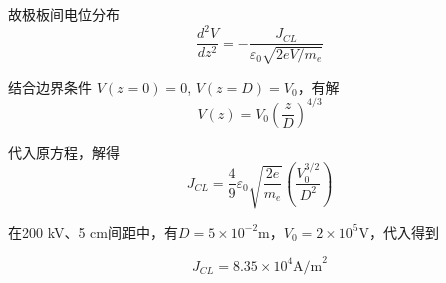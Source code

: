 \documentclass{article}
\begin{document}
故极板间电位分布 $$ \frac{d^2V}{dz^2} = -\frac{J_{CL}}{\varepsilon_0\sqrt{2eV/m_e}} $$

结合边界条件 $V(z = 0) = 0$, $V(z = D) = V_0$，有解 $$V(z) = V_0 \left(\frac{z}{D}\right)^{4/3}$$

代入原方程，解得 $$J_{CL} = \frac{4}{9}\varepsilon_0\sqrt{\frac{2e}{m_e}}\left(\frac{V_0^{3/2}}{D^2}\right)$$


在200 kV、5 cm间距中，有$ D = 5 \times 10^{-2} \text{m}$，$V_0 = 2 \times 10^5 \text{V}$，代入得到

$$ J_{CL} = 8.35 \times 10^4 \text{A/m}^2 $$

\end{document}
